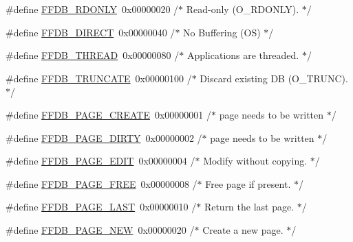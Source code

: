 \begin{DoxyCompactItemize}
\#define \mbox{\hyperlink{adat-devel_2other__libs_2filedb_2filehash_2ffdb__pagepool_8h_a38b90b5bfef518ec2ce0a82caae32e32}{F\+F\+D\+B\+\_\+\+R\+D\+O\+N\+LY}}~0x00000020    /$\ast$ Read-\/only (\+O\+\_\+\+R\+D\+O\+N\+L\+Y). $\ast$/
\item 
\#define \mbox{\hyperlink{adat-devel_2other__libs_2filedb_2filehash_2ffdb__pagepool_8h_a0752e3ac79c56657fcddc9ec8b113664}{F\+F\+D\+B\+\_\+\+D\+I\+R\+E\+CT}}~0x00000040    /$\ast$ No Buffering (\+O\+S)  $\ast$/
\item 
\#define \mbox{\hyperlink{adat-devel_2other__libs_2filedb_2filehash_2ffdb__pagepool_8h_afbd949b4684a5419fea1d6df7d1bcee7}{F\+F\+D\+B\+\_\+\+T\+H\+R\+E\+AD}}~0x00000080    /$\ast$ Applications are threaded. $\ast$/
\item 
\#define \mbox{\hyperlink{adat-devel_2other__libs_2filedb_2filehash_2ffdb__pagepool_8h_a31c6f9982ed977047ebfdfbc58787424}{F\+F\+D\+B\+\_\+\+T\+R\+U\+N\+C\+A\+TE}}~0x00000100    /$\ast$ Discard existing D\+B (\+O\+\_\+\+T\+R\+U\+N\+C). $\ast$/
\item 
\#define \mbox{\hyperlink{adat-devel_2other__libs_2filedb_2filehash_2ffdb__pagepool_8h_a13c5fd155bd487e656eb2779f4d805a3}{F\+F\+D\+B\+\_\+\+P\+A\+G\+E\+\_\+\+C\+R\+E\+A\+TE}}~0x00000001	/$\ast$ page needs to be written $\ast$/
\item 
\#define \mbox{\hyperlink{adat-devel_2other__libs_2filedb_2filehash_2ffdb__pagepool_8h_a83fd5f8f5dfac0274251820d9726c2ea}{F\+F\+D\+B\+\_\+\+P\+A\+G\+E\+\_\+\+D\+I\+R\+TY}}~0x00000002	/$\ast$ page needs to be written $\ast$/
\item 
\#define \mbox{\hyperlink{adat-devel_2other__libs_2filedb_2filehash_2ffdb__pagepool_8h_a0300fb8ffe6959f9be9e9355b560b24c}{F\+F\+D\+B\+\_\+\+P\+A\+G\+E\+\_\+\+E\+D\+IT}}~0x00000004	/$\ast$ Modify without copying. $\ast$/
\item 
\#define \mbox{\hyperlink{adat-devel_2other__libs_2filedb_2filehash_2ffdb__pagepool_8h_aad7a66ec27e19bb172da5596a3cd4f95}{F\+F\+D\+B\+\_\+\+P\+A\+G\+E\+\_\+\+F\+R\+EE}}~0x00000008	/$\ast$ Free page if present. $\ast$/
\item 
\#define \mbox{\hyperlink{adat-devel_2other__libs_2filedb_2filehash_2ffdb__pagepool_8h_af68307f558c015ef865fcd4cf94b38d1}{F\+F\+D\+B\+\_\+\+P\+A\+G\+E\+\_\+\+L\+A\+ST}}~0x00000010	/$\ast$ Return the last page. $\ast$/
\item 
\#define \mbox{\hyperlink{adat-devel_2other__libs_2filedb_2filehash_2ffdb__pagepool_8h_ac13a29f7cca1a74b9309ee383bfd2ce8}{F\+F\+D\+B\+\_\+\+P\+A\+G\+E\+\_\+\+N\+EW}}~0x00000020	/$\ast$ Create a new page. $\ast$/

\end{DoxyCompactItemize}

